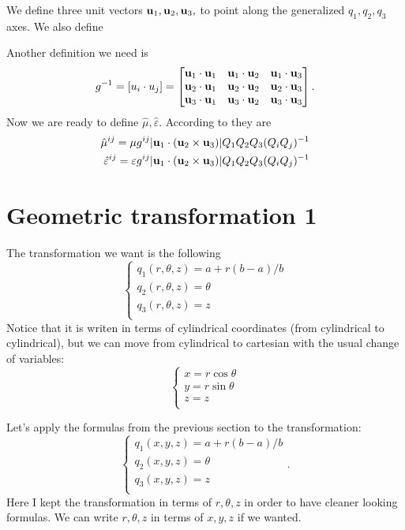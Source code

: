 \documentclass{amsart}
\begin{document}
We define three unit vectors $\textbf{u}_1,\textbf{u}_2,\textbf{u}_3,$ to point along the generalized $q_1,q_2,q_3$ axes.
We also define

Another definition we need is
\begin{equation}\label{matrixg}
  g^{-1}=[u_i\cdot u_j]=\begin{bmatrix}
    \textbf{u}_1\cdot \textbf{u}_1 & \textbf{u}_1\cdot \textbf{u}_2 & \textbf{u}_1\cdot \textbf{u}_3 \\
    \textbf{u}_2\cdot \textbf{u}_1 & \textbf{u}_2\cdot \textbf{u}_2 & \textbf{u}_2\cdot \textbf{u}_3 \\
    \textbf{u}_3\cdot \textbf{u}_1 & \textbf{u}_3\cdot \textbf{u}_2 & \textbf{u}_3\cdot \textbf{u}_3
  \end{bmatrix}.
\end{equation}
Now we are ready to define $\hat{\mu},\hat{\varepsilon}$. According to \cite{ward96} they are
\begin{align}
  \hat{\mu}^{ij}=\mu g^{ij}|\textbf{u}_1\cdot(\textbf{u}_2\times \textbf{u}_3)|Q_1Q_2Q_3(Q_iQ_j)^{-1}\\
  \hat{\varepsilon}^{ij}=\varepsilon g^{ij}|\textbf{u}_1\cdot(\textbf{u}_2\times \textbf{u}_3)|Q_1Q_2Q_3(Q_iQ_j)^{-1} \nonumber
\end{align}

\section{Geometric transformation 1}
The transformation we want is the following
\[\begin{cases}
  q_1(r,\theta,z)=a+r(b-a)/b\\
  q_2(r,\theta,z)=\theta\\
  q_3(r,\theta,z)=z\\
\end{cases}\]
Notice that it is writen in terms of cylindrical coordinates
(from cylindrical to cylindrical), but we can move from cylindrical
to cartesian with the usual change of variables:
\begin{equation}
  \begin{cases}\label{cylindrical}
  x=r\cos\theta\\
  y=r\sin\theta\\
  z=z\\
\end{cases}
\end{equation}

Let's apply the formulas from the previous section to the transformation:
\[\begin{cases}
  q_1(x,y,z)=a+r(b-a)/b\\
  q_2(x,y,z)=\theta\\
q_3(x,y,z)=z\\
\end{cases}.\]
Here I kept the transformation in terms of $r,\theta,z$ in order to have cleaner looking formulas.
We can write $r,\theta,z$ in terms of $x,y,z$ if we wanted.
\end{document}
